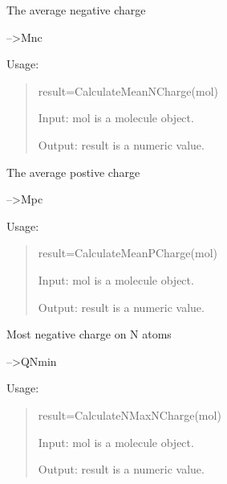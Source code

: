 \documentclass[letterpaper,10pt,english]{sphinxmanual}
\begin{document}

\begin{fulllineitems}
\label{reference/charge:charge.CalculateMeanNCharge}
The average negative charge

--\textgreater{}Mnc

Usage:
\begin{quote}

result=CalculateMeanNCharge(mol)

Input: mol is a molecule object.

Output: result is a numeric value.
\end{quote}

\end{fulllineitems}


\begin{fulllineitems}
\label{reference/charge:charge.CalculateMeanPCharge}
The average postive charge

--\textgreater{}Mpc

Usage:
\begin{quote}

result=CalculateMeanPCharge(mol)

Input: mol is a molecule object.

Output: result is a numeric value.
\end{quote}

\end{fulllineitems}


\begin{fulllineitems}
\label{reference/charge:charge.CalculateNMaxNCharge}
Most negative charge on N atoms

--\textgreater{}QNmin

Usage:
\begin{quote}

result=CalculateNMaxNCharge(mol)

Input: mol is a molecule object.

Output: result is a numeric value.
\end{quote}

\end{fulllineitems}
\end{document}
